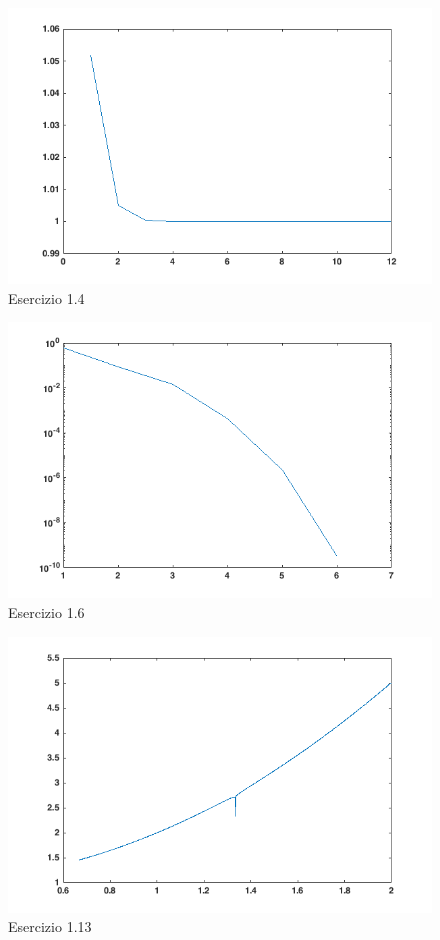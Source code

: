 \begin{figure}[h]
\includegraphics[width=\textwidth]{cap_1/es4/es4.png}
\caption{Esercizio 1.4}
\label{es14}
\end{figure}

\begin{figure}[h]
\includegraphics[width=\textwidth]{cap_1/es6/es6.png}
\caption{Esercizio 1.6}
\label{es16}
\end{figure}

\begin{figure}[h]
\includegraphics[width=\textwidth]{cap_1/es13/es13.png}
\caption{Esercizio 1.13}
\label{es113}
\end{figure}

